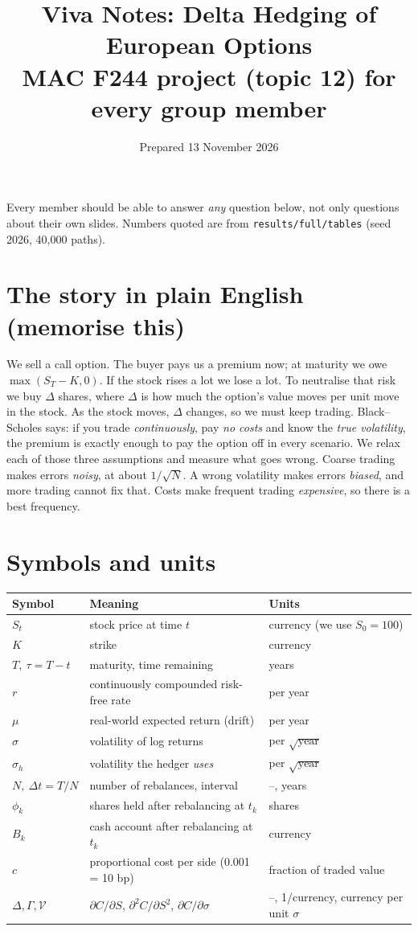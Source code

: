 \documentclass[10.5pt,a4paper]{article}
\title{Viva Notes: Delta Hedging of European Options\\\large MAC F244 project (topic 12) \textemdash{} for every group member}
\date{Prepared 13 November 2026}
\begin{document}
\maketitle
\noindent Every member should be able to answer \emph{any} question below, not only questions about their own slides.
Numbers quoted are from \texttt{results/full/tables} (seed 2026, 40{,}000 paths).

\tableofcontents

\section{The story in plain English (memorise this)}
We sell a call option. The buyer pays us a premium now; at maturity we owe $\max(S_T-K,0)$. If the stock rises a lot we lose a lot.
To neutralise that risk we buy $\Delta$ shares, where $\Delta$ is how much the option's value moves per unit move in the stock. As the stock moves, $\Delta$ changes, so we must keep
trading. Black--Scholes says: if you trade \emph{continuously}, pay \emph{no costs} and know the \emph{true volatility}, the premium is exactly enough to pay the
option off in every scenario. We relax each of those three assumptions and measure what goes wrong. Coarse trading makes errors \emph{noisy}, at about $1/\sqrt N$. A wrong volatility makes errors
\emph{biased}, and more trading cannot fix that. Costs make frequent trading \emph{expensive}, so there is a best frequency.

\section{Symbols and units}
\begin{tabular}{@{}lll@{}}\toprule
Symbol & Meaning & Units\\\midrule
$S_t$ & stock price at time $t$ & currency (we use $S_0=100$)\\
$K$ & strike & currency\\
$T,\ \tau=T-t$ & maturity, time remaining & years\\
$r$ & continuously compounded risk-free rate & per year\\
$\mu$ & real-world expected return (drift) & per year\\
$\sigma$ & volatility of log returns & per $\sqrt{\text{year}}$\\
$\sigma_h$ & volatility the hedger \emph{uses} & per $\sqrt{\text{year}}$\\
$N,\ \Delta t=T/N$ & number of rebalances, interval & --, years\\
$\phi_k$ & shares held after rebalancing at $t_k$ & shares\\
$B_k$ & cash account after rebalancing at $t_k$ & currency\\
$c$ & proportional cost per side (0.001 = 10 bp) & fraction of traded value\\
$\Delta,\Gamma,\mathcal V$ & $\partial C/\partial S$, $\partial^2C/\partial S^2$, $\partial C/\partial\sigma$ & --, 1/currency, currency per unit $\sigma$\\\bottomrule
\end{tabular}
\end{document}
